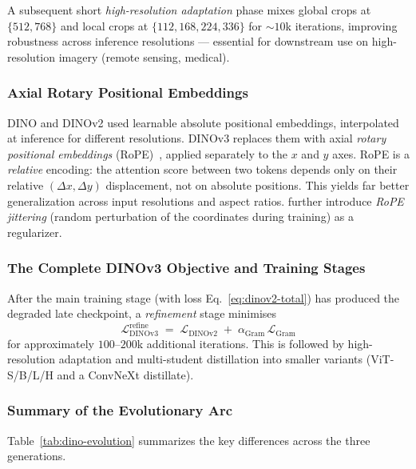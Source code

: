 \documentclass[11pt,a4paper]{article}
\newcommand{\loss}{\mathcal{L}}
\begin{document}
A subsequent short \emph{high-resolution adaptation} phase mixes global
crops at $\{512,768\}$ and local crops at $\{112,168,224,336\}$ for
$\sim\!10$k iterations, improving robustness across inference resolutions
--- essential for downstream use on high-resolution imagery (remote
sensing, medical).

\subsubsection{Axial Rotary Positional Embeddings}

DINO and DINOv2 used learnable absolute positional embeddings, interpolated
at inference for different resolutions. DINOv3 replaces them with axial
\emph{rotary positional embeddings} (RoPE)~\citep{su2024roformer}, applied
separately to the $x$ and $y$ axes. RoPE is a \emph{relative} encoding: the
attention score between two tokens depends only on their relative
$(\Delta x, \Delta y)$ displacement, not on absolute positions. This
yields far better generalization across input resolutions and aspect
ratios. \citet{simeoni2025dinov3} further introduce \emph{RoPE jittering}
(random perturbation of the coordinates during training) as a
regularizer.

\subsubsection{The Complete DINOv3 Objective and Training Stages}

After the main training stage (with loss
Eq.~\eqref{eq:dinov2-total}) has produced the degraded late checkpoint,
a \emph{refinement} stage minimises
\begin{equation}
\loss_{\text{DINOv3}}^{\text{refine}}
\;=\;
\loss_{\text{DINOv2}}
\;+\;
\alpha_{\text{Gram}}\, \loss_{\text{Gram}}
\label{eq:dinov3-refine}
\end{equation}
for approximately $100$--$200$k additional iterations. This is followed by
high-resolution adaptation and multi-student distillation into smaller
variants (ViT-S/B/L/H and a ConvNeXt distillate).

\subsubsection{Summary of the Evolutionary Arc}

Table~\ref{tab:dino-evolution} summarizes the key differences across the
three generations.
\end{document}
